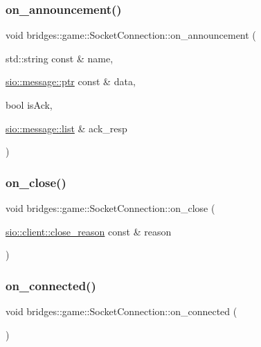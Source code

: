 \subsubsection{\texorpdfstring{on\+\_\+announcement()}{on\_announcement()}}
{\footnotesize\ttfamily void bridges\+::game\+::\+Socket\+Connection\+::on\+\_\+announcement (\begin{DoxyParamCaption}\item[{std\+::string const \&}]{name,  }\item[{\hyperlink{classsio_1_1message_a6340b6fef57e4516eb17928b1885a615}{sio\+::message\+::ptr} const \&}]{data,  }\item[{bool}]{is\+Ack,  }\item[{\hyperlink{classsio_1_1message_1_1list}{sio\+::message\+::list} \&}]{ack\+\_\+resp }\end{DoxyParamCaption})\hspace{0.3cm}{\ttfamily [inline]}}

\mbox{\label{classbridges_1_1game_1_1_socket_connection_aa5e6acd2a7ceab61ea1dbcadebc28098}} 
\subsubsection{\texorpdfstring{on\+\_\+close()}{on\_close()}}
{\footnotesize\ttfamily void bridges\+::game\+::\+Socket\+Connection\+::on\+\_\+close (\begin{DoxyParamCaption}\item[{\hyperlink{classsio_1_1client_a5c8b6c424134f40b3e9bf488b4961aaf}{sio\+::client\+::close\+\_\+reason} const \&}]{reason }\end{DoxyParamCaption})\hspace{0.3cm}{\ttfamily [inline]}}

\mbox{\label{classbridges_1_1game_1_1_socket_connection_a462538c1de9e1840b81a5390ef3632ae}} 
\subsubsection{\texorpdfstring{on\+\_\+connected()}{on\_connected()}}
{\footnotesize\ttfamily void bridges\+::game\+::\+Socket\+Connection\+::on\+\_\+connected (\begin{DoxyParamCaption}{ }\end{DoxyParamCaption})\hspace{0.3cm}{\ttfamily [inline]}}

